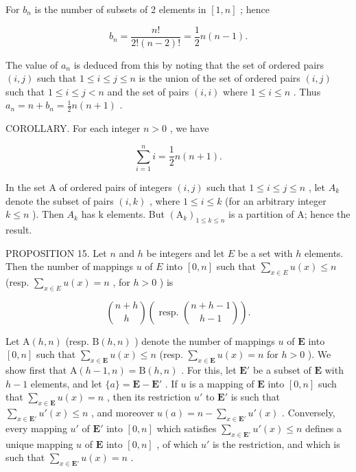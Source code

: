 For \(b_{n}\) is the number of subsets of 2 elements in \([1, n]\) ; hence

\[
b _ {n} = \frac {n !}{2 ! (n - 2) !} = \frac {1}{2} n (n - 1).
\]

The value of \(a_{n}\) is deduced from this by noting that the set of ordered pairs \((i, j)\) such that \(1 \leqslant i \leqslant j \leqslant n\) is the union of the set of ordered pairs \((i, j)\) such that \(1 \leqslant i \leqslant j < n\) and the set of pairs \((i, i)\) where \(1 \leqslant i \leqslant n\) . Thus \(a_{n} = n + b_{n} = \frac{1}{2} n(n + 1)\) .

COROLLARY. For each integer \(n > 0\) , we have

\[
\sum_ {i = 1} ^ {n} i = \frac {1}{2} n (n + 1).
\]

In the set A of ordered pairs of integers \((i, j)\) such that \(1 \leqslant i \leqslant j \leqslant n\) , let \(A_{k}\) denote the subset of pairs \((i, k)\) , where \(1 \leqslant i \leqslant k\) (for an arbitrary integer \(k \leqslant n\) ). Then \(A_{k}\) has k elements. But \((\mathrm{A}_{k})_{1 \leqslant k \leqslant n}\) is a partition of A; hence the result.

PROPOSITION 15. Let \(n\) and \(h\) be integers and let \(E\) be a set with \(h\) elements. Then the number of mappings \(u\) of \(E\) into \([0, n]\) such that \(\sum_{x \in E} u(x) \leqslant n\) (resp. \(\sum_{x \in E} u(x) = n\) , for \(h > 0\) ) is

\[
\binom {n + h} {h} \left(\text { resp. } \binom {n + h - 1} {h - 1}\right).
\]

Let \(\mathrm{A}(h, n)\) (resp. \(\mathrm{B}(h, n)\) ) denote the number of mappings \(u\) of \(\mathbf{E}\) into \([0, n]\) such that \(\sum_{x \in \mathbf{E}} u(x) \leqslant n\) (resp. \(\sum_{x \in \mathbf{E}} u(x) = n\) for \(h > 0\) ). We show first that \(\mathrm{A}(h - 1, n) = \mathrm{B}(h, n)\) . For this, let \(\mathbf{E}'\) be a subset of \(\mathbf{E}\) with \(h - 1\) elements, and let \(\{a\} = \mathbf{E} - \mathbf{E}'\) . If \(u\) is a mapping of \(\mathbf{E}\) into \([0, n]\) such that \(\sum_{x \in \mathbf{E}} u(x) = n\) , then its restriction \(u'\) to \(\mathbf{E}'\) is such that \(\sum_{x \in \mathbf{E}'} u'(x) \leqslant n\) , and moreover \(u(a) = n - \sum_{x \in \mathbf{E}'} u'(x)\) . Conversely, every mapping \(u'\) of \(\mathbf{E}'\) into \([0, n]\) which satisfies \(\sum_{x \in \mathbf{E}'} u'(x) \leqslant n\) defines a unique mapping \(u\) of \(\mathbf{E}\) into \([0, n]\) , of which \(u'\) is the restriction, and which is such that \(\sum_{x \in \mathbf{E}'} u(x) = n\) .

